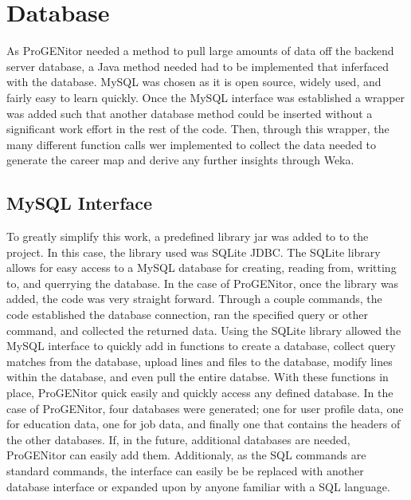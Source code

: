 \section{Database}
\label{sect:database}
As ProGENitor needed a method to pull large amounts of data off the backend
server database, a Java method needed had to be implemented that inferfaced with
the database.  MySQL was chosen as it is open source, widely used, and fairly
easy to learn quickly.  Once the MySQL interface was established a wrapper was
added such that another database method could be inserted without a significant
work effort in the rest of the code.  Then, through this wrapper, the many
different function calls wer implemented to collect the data needed to generate
the career map and derive any further insights through Weka.

\subsection{MySQL Interface}
To greatly simplify this work, a predefined library jar was added
to to the project.  In this case, the library used was SQLite JDBC.  The SQLite
library allows for easy access to a MySQL database for creating, reading from,
writting to, and querrying the database.  In the case of ProGENitor, once the
library was added, the code was very straight forward.  Through a couple
commands, the code established the database connection, ran the specified query
or other command, and collected the returned data.\cite{sqlite}  Using the
SQLite library allowed the MySQL interface to quickly add in functions to create
a database, collect query matches from the database, upload lines and files to
the database, modify lines within the database, and even pull the entire
databse.  With these functions in place, ProGENitor quick easily and quickly
access any defined database.  In the case of ProGENitor, four databases were
generated; one for user profile data, one for education data, one for job data,
and finally one that contains the headers of the other databases.  If, in the
future, additional databases are needed, ProGENitor can easily add them. 
Additionaly, as the SQL commands are standard commands, the interface can easily
be be replaced with another database interface or expanded upon by anyone
familiar with a SQL language.

